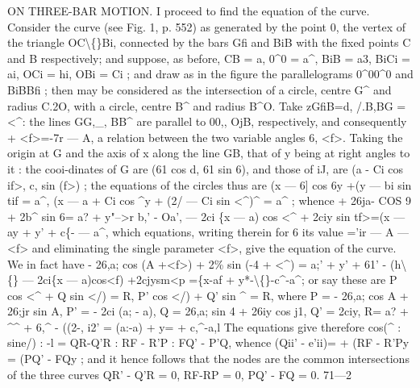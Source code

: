 \documentclass[11pt,a4paper]{book}
\begin{document}
ON THREE-BAR MOTION.
I proceed
to
find the equation of the
curve.
Consider
the
curve
(see
Fig.
1,
p. 552) as
generated by the point
0,
the vertex
of
the
triangle
OC\textbackslash\{\}Bi, connected by the
bars
Gfi and BiB with
the
fixed points C and B
respectively;
and
suppose,
as
before, CB = a,
0\textasciicircum{}0 = a\textasciicircum{},
BiB = a3,
BiCi = ai,
OCi = hi,
OBi = Ci
;
and
draw
as
in
the
figure
the
parallelograms
0\textasciicircum{}00\textasciicircum{}0
and BiBBfi
;
then
may
be
considered
as
the
intersection
of
a
circle,
centre
G\textasciicircum{}
and
radius
C.2O,
with
a
circle,
centre
B\textasciicircum{}
and
radius
B\textasciicircum{}O.
Take
zGfiB=d,
/.B,BG = <\textasciicircum{}:
the
lines
GG,\_,
BB\textasciicircum{}
are
parallel
to 00,,
OjB,
respectively, and consequently
+ <f>=-7r --- A, a
relation between
the two variable angles
6,
<f>.
Taking
the
origin
at G
and
the
axis
of
x
along
the
line
GB,
that
of y
being
at
right
angles
to
it
:
the
cooi-dinates
of
G\guillemotleft{}
are
(61 cos d,
61 sin 6),
and
those
of
iJ,
are (a - Ci cos
if>,
c, sin (f>)
;
the equations of the
circles thus are
(x --- 6] cos 6y
+(y --- bi sin tif = a\textasciicircum{},
(x --- a + Ci cos \textasciicircum{}y + (2/ --- Ci sin <\textasciicircum{})\textasciicircum{} = a\textasciicircum{} ;
whence
+ 26ja- COS 9 + 2b\textasciicircum{} sin 6=
a? + y"-->r b,' - Oa',
--- 2ci \{x --- a) cos <\textasciicircum{} + 2ciy sin tf>=(x --- ay + y' + c\{- --- a\textasciicircum{},
which
equations,
writing
therein
for
6
its
value
='ir --- A ---
<f>
and
eliminating
the
single parameter
<f>, give the equation
of the
curve.
We
in
fact have
- 26,a; cos (A +<f>) + 2\% sin (-4 + <\textasciicircum{}) =
a;' + y' + 61' - (h\textbackslash\{\}
--- 2ci\{x --- a)cos<f)
+2cjysm<p
=\{x-af + y*-\textbackslash\{\}-c\textasciicircum{}-a\textasciicircum{};
or say these are
P cos <\textasciicircum{} + Q sin
</) = R,
P' cos
</) + Q' sin \textasciicircum{} = R,
where
P = - 26,a; cos A + 26;jr sin A, P' = - 2ci (a; - a),
Q =
26,a; sin 4 + 26iy cos j1,
Q' =
2ciy,
R=
a? + \textasciicircum{}\textasciicircum{} + 6,\textasciicircum{} - ((2-,
i2' = (a:-a)\guillemotright{} + y= + c,\textasciicircum{}-a,l
The equations give therefore
cos(\textasciicircum{}
:
sine/)
: -l = QR-Q'R
: RF - R'P
: FQ' - P'Q,
whence
(Qii' - e'ii)= + (RF - R'Py = (PQ' - FQy
;
and
it hence
follows
that
the nodes are
the common
intersections
of the
three curves
QR' - Q'R = 0, RF-RP = 0, PQ' - FQ = 0.
71---2
\end{document}

